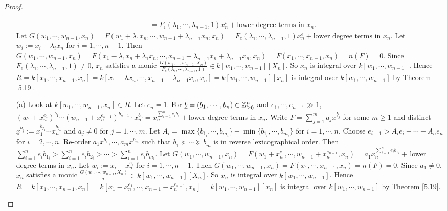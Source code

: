 \begin{proof}
\begin{enumerate}
\begin{align*}
                &= F_i(\lambda_1,\cdots,\lambda_{n-1},1)x_n^{i} + \text{lower degree terms in $x_n$}. 
            \end{align*}
            Let $G(w_1,\cdots,w_{n-1},x_n) = F(w_1+\lambda_1x_n,\cdots,w_{n-1}+\lambda_{n-1}x_n,x_n) = F_e(\lambda_1,\cdots,\lambda_{n-1},1)x_n^{e} + \text{lower degree terms in $x_n$}$. Let $w_i := x_i-\lambda_ix_n$ for $i = 1,\cdots,n-1$. Then $G(w_1,\cdots,w_{n-1},x_n) = F(x_1-\lambda_1x_n+\lambda_1x_n,\cdots,x_{n-1}-\lambda_{n-1}x_n + \lambda_{n-1}x_n,x_n) = F(x_1,\cdots,x_{n-1},x_n) = n(F) = 0$. Since $F_e(\lambda_1,\cdots,\lambda_{n-1},1) \neq 0$, $x_n$ satisfies a monic $\frac{G(w_1,\cdots,w_{n-1},X_n)}{F_e(\lambda_1,\cdots,\lambda_{n-1},1)} \in k[w_1,\cdots,w_{n-1}][X_n]$. So $x_n$ is integral over $k[w_1,\cdots,w_{n-1}]$. Hence $R = k[x_1,\cdots,x_{n-1},x_n] = k[x_1-\lambda x_n,\cdots,x_{n-1}-\lambda_{n-1}x_n,x_n] = k[w_1,\cdots,w_{n-1}][x_n]$ is integral over $k[w_1,\cdots,w_{n-1}]$ by Theorem \ref{5.19}. \par 
        \item[(a)]   
            Look at $k[w_1,\cdots,w_{n-1},x_n] \in R$. Let $e_n = 1$. For $\underline b = (b_1,\cdots,b_n) \in \mathbb{Z}_{\geq 0}^{n}$ and $e_1,\cdots,e_{n-1} \gg 1$, $(w_1+x_n^{e_1})^{b_1} \cdots (w_{n-1} + x_n^{e_{n-1}})^{b_{n-1}} \cdot x_n^{b_n} = x_n^{\sum_{i=1}^{n}e_ib_i} + \text{lower degree terms in $x_n$}$. Write $F = \sum_{j=1}^{m} a_j \underline x^{\underline b_j}$ for some $m \geq 1$ and distinct $\underline x^{\underline b_j} := x_1^{b_{j_1}} \cdots x_n^{b_{j_n}}$ and $a_j \neq 0$ for $j = 1,\cdots,m$. Let $A_i = \max\{b_{1_i},\cdots,b_{m_i}\} - \min\{b_{1_i},\cdots,b_{m_i}\}$ for $i = 1,\cdots,n$. Choose $e_{i-1} > A_ie_i + \cdots + A_ne_n$ for $i = 2,\cdots,n$. Re-order $a_1 \underline x^{\underline b_1},\cdots,a_m \underline x^{\underline b_m}$ such that $\underline b_1 \succcurlyeq \cdots \succcurlyeq \underline b_m$ is in reverse lexicographical order. Then $\sum_{i=1}^{n}e_ib_{1_i} > \sum_{i=1}^{n} e_ib_{2_i} > \cdots > \sum_{i=1}^{n} e_ib_{m_i}$. Let $G(w_1,\cdots,w_{n-1},x_n) = F(w_1+x_n^{e_1},\cdots,w_{n-1}+x_n^{e_{n-1}},x_n) = a_1x_n^{\sum_{i=1}^{n}e_ib_{1_i}}+\,$lower degree terms in $x_n$. Let $w_i := x_i-x_n^{e_i}$ for $i = 1,\cdots,n-1$. Then $G(w_1,\cdots,w_{n-1},x_n) = F(x_1,\cdots,x_{n-1},x_n) = n(F) = 0$. Since $a_1 \neq 0$, $x_n$ satisfies a monic $\frac{G(w_1,\cdots,w_{n-1},X_n)}{a_1} \in k[w_1,\cdots,w_{n-1}][X_n]$. So $x_n$ is integral over $k[w_1,\cdots,w_{n-1}]$. Hence $R = k[x_1,\cdots,x_{n-1},x_n] = k[x_1-x_n^{e_1},\cdots,x_{n-1}-x_{n}^{e_{n-1}},x_n] = k[w_1,\cdots,w_{n-1}][x_n]$ is integral over $k[w_1,\cdots,w_{n-1}]$ by Theorem \ref{5.19}. \qedhere
    \end{enumerate}
\end{proof}

